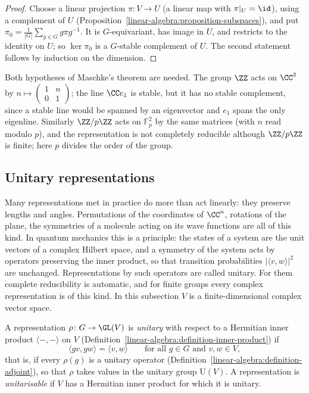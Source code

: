 \begin{proof}
Choose a linear projection $\pi \colon V \to U$ (a linear map with $\pi|_U = \id$), using a complement of $U$
(Proposition~\ref{linear-algebra:proposition-subspaces}), and put
$\pi_0 = \frac{1}{|G|}\sum_{g \in G} g\pi g^{-1}$. It is $G$-equivariant, has image in $U$, and restricts to the identity
on $U$; so $\ker\pi_0$ is a $G$-stable complement of $U$. The second statement follows by induction on the
dimension.
\end{proof}

\begin{counterexample}\label{representation-theory:counterexample-not-semisimple}
Both hypotheses of Maschke's theorem are needed. The group $\ZZ$ acts on $\CC^2$ by
$n \mapsto \begin{pmatrix} 1 & n \\ 0 & 1 \end{pmatrix}$; the line $\CC e_1$ is stable, but it has no stable complement, since a
stable line would be spanned by an eigenvector and $e_1$ spans the only eigenline. Similarly $\ZZ/p\ZZ$ acts on
$\mathbb{F}_p^2$ by the same matrices (with $n$ read modulo $p$), and the representation is not completely
reducible although $\ZZ/p\ZZ$ is finite; here $p$ divides the order of the group.
\end{counterexample}

\subsection{Unitary representations}\label{representation-theory:subsection-unitary}

Many representations met in practice do more than act linearly: they preserve lengths and angles. Permutations of the coordinates of $\CC^n$, rotations of the plane, the symmetries
of a molecule acting on its wave functions are all of this kind. In quantum mechanics this is a principle: the states of a system are the unit vectors of a complex Hilbert space, and a
symmetry of the system acts by operators preserving the inner product, so that transition probabilities $|\langle v, w\rangle|^2$ are unchanged. Representations by such operators are
called unitary. For them complete reducibility is automatic, and for finite groups every complex representation is of this kind. In this subsection $V$ is a finite-dimensional
complex vector space.

\begin{definition}\label{representation-theory:definition-unitary}
A representation $\rho \colon G \to \GL(V)$ is \emph{unitary} with respect to a Hermitian inner product $\langle -, - \rangle$ on $V$ (Definition~\ref{linear-algebra:definition-inner-product}) if
\[
\langle gv, gw \rangle = \langle v, w \rangle \qquad \text{for all } g \in G \text{ and } v, w \in V,
\]
that is, if every $\rho(g)$ is a unitary operator (Definition~\ref{linear-algebra:definition-adjoint}), so that $\rho$ takes values in the unitary group $\mathrm{U}(V)$. A representation is
\emph{unitarisable} if $V$ has a Hermitian inner product for which it is unitary.
\end{definition}

